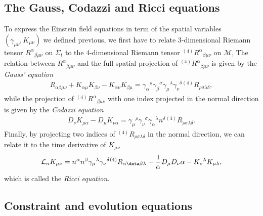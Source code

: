 \subsection{The Gauss, Codazzi and Ricci equations}
\label{section2.2.4}

To express the Einstein field equations in term of the spatial variables $(\gamma_{\mu\nu}, K_{\mu\nu})$ we defined previous,
we first have to relate 3-dimensional Riemann tensor $R^\alpha{}_{\beta\mu\nu}$ on $\Sigma_t$ to the 4-dimensional Riemann tensor ${}^{(4)}R^\alpha{}_{\beta\mu\nu}$ on $\mathcal{M}$,
The relation between $R^\alpha{}_{\beta\mu\nu}$ and the full spatial projection of ${}^{(4)}R^\alpha{}_{\beta\mu\nu}$ is given by the \textit{Gauss' equation}
\begin{align}\label{eq:Gauss}
    R_{\alpha\beta\mu\nu} + K_{\alpha\mu}K_{\beta\nu} - K_{\alpha\nu} K_{\beta\mu} = \gamma_{\alpha}{}^{\rho} \gamma_{\beta}{}^{\sigma} \gamma_{\mu}{}^{\lambda} \gamma_{\nu}{}^{\delta} {}^{(4)}R_{\rho\sigma\lambda\delta},
\end{align}
while the projection of ${}^{(4)}R^\alpha{}_{\beta\mu\nu}$ with one index projected in the normal direction is given by the \textit{Codazzi equation}
\begin{align}\label{eq:Codazzi}
    D_{\nu} K_{\mu\alpha} - D_{\mu} K_{\nu\alpha} = \gamma_{\mu}{}^{\rho} \gamma_{\nu}{}^{\sigma} \gamma_{\alpha}{}^{\lambda} n^{\delta} {}^{(4)}R_{\rho\sigma\lambda\delta}.
\end{align}
Finally, by projecting two indices of ${}^{(4)}R_{\rho\sigma\lambda\delta}$ in the normal direction,
we can relate it to the time derivative of $K_{\mu\nu}$
\begin{align}\label{eq:Ricci}
    \mathcal{L}_n K_{\mu\nu} = n^{\alpha} n^{\beta} \gamma_{\mu}{}^{\lambda} \gamma_{\nu}{}^{\delta} {}^{(4)}R_{\alpha\deta\beta\lambda} - \frac{1}{\alpha} D_{\mu} D_\nu \alpha - K_{\nu}{}^{\lambda}K_{\mu\lambda},
\end{align}
which is called the \textit{Ricci equation}.

\subsection{Constraint and evolution equations} %
\label{section2.2.5}

